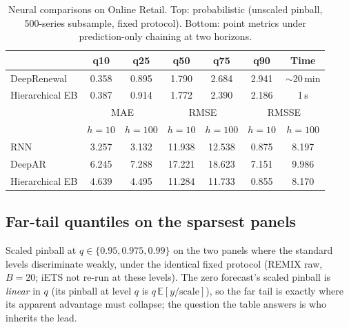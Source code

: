 \documentclass[twocolumn,10pt]{article}
\newcommand{\E}{\mathbb{E}}
\begin{document}
\begin{table}[t]
\centering
\caption{Neural comparisons on Online Retail. Top: probabilistic
(unscaled pinball, 500-series subsample, fixed protocol). Bottom: point
metrics under prediction-only chaining at two horizons.}
\label{tab:neural}
\small
\setlength{\tabcolsep}{4pt}
\begin{tabular}{lcccccc}
\toprule
 & q10 & q25 & q50 & q75 & q90 & Time\\
\midrule
DeepRenewal & 0.358 & 0.895 & 1.790 & 2.684 & 2.941 & $\sim$20\,min\\
Hierarchical EB & 0.387 & 0.914 & 1.772 & 2.390 & 2.186 & 1\,s\\
\midrule
 & \multicolumn{2}{c}{MAE} & \multicolumn{2}{c}{RMSE} & \multicolumn{2}{c}{RMSSE}\\
 & $h{=}10$ & $h{=}100$ & $h{=}10$ & $h{=}100$ & $h{=}10$ & $h{=}100$\\
\midrule
RNN & 3.257 & 3.132 & 11.938 & 12.538 & 0.875 & 8.197\\
DeepAR & 6.245 & 7.288 & 17.221 & 18.623 & 7.151 & 9.986\\
Hierarchical EB & 4.639 & 4.495 & 11.284 & 11.733 & 0.855 & 8.170\\
\bottomrule
\end{tabular}
\end{table}

\subsection{Far-tail quantiles on the sparsest panels}
\label{app:fartail}

Scaled pinball at $q\in\{0.95,0.975,0.99\}$ on the two panels where the
standard levels discriminate weakly, under the identical fixed protocol
(REMIX raw, $B{=}20$; iETS not re-run at these levels). The zero
forecast's scaled pinball is \emph{linear} in $q$ (its pinball at level
$q$ is $q\,\E[y/\mathrm{scale}]$), so the far tail is exactly where its
apparent advantage must collapse; the question the table answers is who
inherits the lead.
\end{document}
